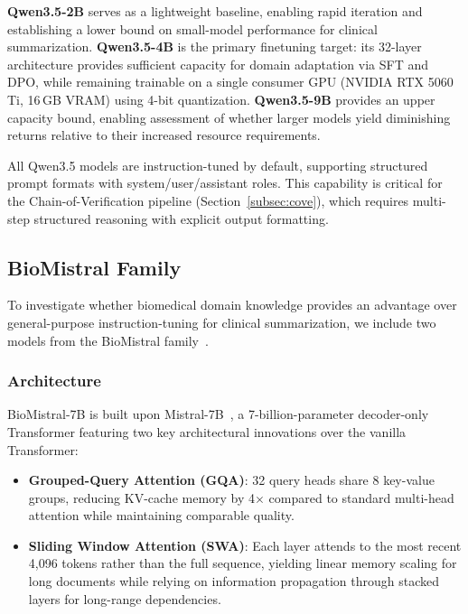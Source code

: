\documentclass[12pt,a4paper,oneside]{report}
\begin{document}
\textbf{Qwen3.5-2B} serves as a lightweight baseline, enabling rapid iteration and establishing a lower bound on small-model performance for clinical summarization. \textbf{Qwen3.5-4B} is the primary finetuning target: its 32-layer architecture provides sufficient capacity for domain adaptation via SFT and DPO, while remaining trainable on a single consumer GPU (NVIDIA RTX 5060 Ti, 16\,GB VRAM) using 4-bit quantization. \textbf{Qwen3.5-9B} provides an upper capacity bound, enabling assessment of whether larger models yield diminishing returns relative to their increased resource requirements.

All Qwen3.5 models are instruction-tuned by default, supporting structured prompt formats with system/user/assistant roles. This capability is critical for the Chain-of-Verification pipeline (Section~\ref{subsec:cove}), which requires multi-step structured reasoning with explicit output formatting.

\subsection{BioMistral Family}
\label{subsec:biomistral}

To investigate whether biomedical domain knowledge provides an advantage over general-purpose instruction-tuning for clinical summarization, we include two models from the BioMistral family~\cite{labrak2024biomistral}.

\subsubsection{Architecture}

BioMistral-7B is built upon Mistral-7B~\cite{jiang2023mistral}, a 7-billion-parameter decoder-only Transformer featuring two key architectural innovations over the vanilla Transformer:

\begin{itemize}
    \item \textbf{Grouped-Query Attention (GQA)}: 32 query heads share 8 key-value groups, reducing KV-cache memory by 4$\times$ compared to standard multi-head attention while maintaining comparable quality.
    \item \textbf{Sliding Window Attention (SWA)}: Each layer attends to the most recent 4,096 tokens rather than the full sequence, yielding linear memory scaling for long documents while relying on information propagation through stacked layers for long-range dependencies.
\end{itemize}
\end{document}
